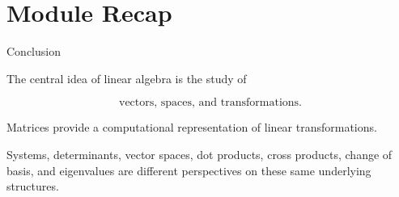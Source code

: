 

\section{Module Recap}


\begin{frame}{Conclusion}

The central idea of linear algebra is the study of

\[
\boxed{
\text{vectors, spaces, and transformations}.
}
\]

\vspace{0.4cm}

Matrices provide a computational representation of
linear transformations.

\vspace{0.4cm}

Systems, determinants, vector spaces, dot products,
cross products, change of basis, and eigenvalues are
different perspectives on these same underlying structures.

\vspace{0.4cm}

\end{frame}